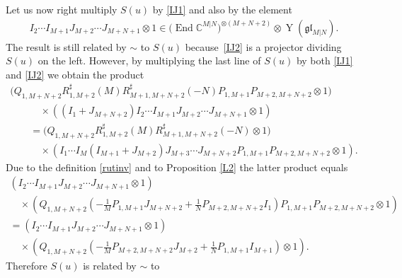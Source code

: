 \documentclass[pdftex]{sigma}
\numberwithin{equation}{section}
\def\CC{{\mathbb{C}}}
\def\CMN{\CC^{M|N}}
\def\End{\operatorname{End}}
\def\glMN{\mathfrak{gl}_{M|N}}
\def\ot{\otimes}
\def\RS{R^{\sharp}}
\def\YMN{\operatorname{Y}(\glMN)}
\begin{document}
Let us now right multiply $S(u)$ by \eqref{IJ1} and also by the element
\begin{gather}
\label{IJ2}
I_{2} \cdots I_{M+1}
J_{M+2} \cdots J_{M+N+1}\ot1\in
\big(\End\CMN\big)^{\ot (M+N+2)}\ot\YMN .
\end{gather}
The result is still related by $\sim$ to $S(u)$ because~\eqref{IJ2}
is a projector dividing $S(u)$ on the left.
However, by multiplying the last line of $S(u)$
by both \eqref{IJ1} and \eqref{IJ2} we obtain the product
\begin{gather*}
 \big( Q_{1,M+N+2} \RS_{1,M+2} (M ) \RS_{M+1,M+N+2} (-N )
P_{1,M+1} P_{M+2,M+N+2}\ot1 \big)\\
\qquad\quad{} \times
( ( I_{1}+J_{M+N+2} )
I_{2} \cdots I_{M+1}
J_{M+2} \cdots J_{M+N+1}\ot1 ) \\
\qquad{} =
\big( Q_{1,M+N+2} \RS_{1,M+2} (M ) \RS_{M+1,M+N+2} (-N )
\ot1 \big)\\
\qquad\quad{} \times
( I_{1} \cdots I_{M} ( I_{M+1}+J_{M+2} )
J_{M+3} \cdots J_{M+N+2}
P_{1,M+1} P_{M+2,M+N+2}\ot1 ) .
\end{gather*}Due to the definition \eqref{rutinv} and to
Proposition \ref{L2} the latter product equals
\begin{gather*}
 ( I_{2} \cdots I_{M+1}
J_{M+2} \cdots J_{M+N+1}\ot1 )\\
\quad{} \times
\left( Q_{1,M+N+2}
\left(- \frac1M P_{1,M+1} J_{M+N+2}+
\frac1N P_{M+2,M+N+2} I_{1} \right)
 P_{1,M+1} P_{M+2,M+N+2}\ot1 \right)\\
{} =
( I_{2} \cdots I_{M+1}
J_{M+2} \cdots J_{M+N+1}\ot1 )\\
\quad{} \times
\left( Q_{1,M+N+2}
\left(- \frac1M P_{M+2,M+N+2} J_{M+2}+
\frac1N P_{1,M+1} I_{M+1} \right)\ot1 \right) .
\end{gather*}
Therefore $S(u)$ is related by $\sim$ to
\end{document}
